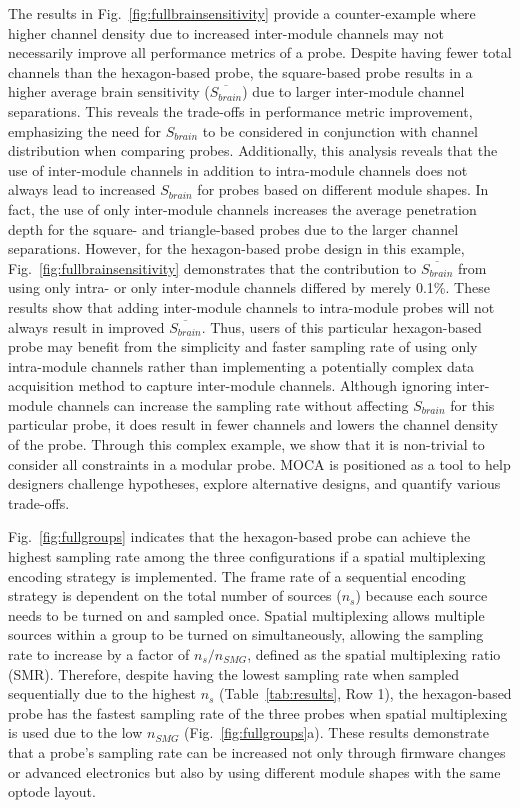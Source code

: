 The results in Fig.~\ref{fig:fullbrainsensitivity} provide a counter-example where higher channel density due to increased inter-module channels may not necessarily improve all performance metrics of a probe. Despite having fewer total channels than the hexagon-based probe, the square-based probe results in a higher average brain sensitivity ($\overline{S_{brain}}$) due to larger inter-module channel separations. This reveals the trade-offs in performance metric improvement, emphasizing the need for $S_{brain}$ to be considered in conjunction with channel distribution when comparing probes. Additionally, this analysis reveals that the use of inter-module channels in addition to intra-module channels does not always lead to increased $S_{brain}$ for probes based on different module shapes. In fact, the use of only inter-module channels increases the average penetration depth for the square- and triangle-based probes due to the larger channel separations. However, for the hexagon-based probe design in this example, Fig.~\ref{fig:fullbrainsensitivity} demonstrates that the contribution to $\overline{S_{brain}}$ from using only intra- or only inter-module channels differed by merely 0.1\%. These results show that adding inter-module channels to intra-module probes will not always result in improved $\overline{S_{brain}}$. Thus, users of this particular hexagon-based probe may benefit from the simplicity and faster sampling rate of using only intra-module channels rather than implementing a potentially complex data acquisition method to capture inter-module channels. Although ignoring inter-module channels can increase the sampling rate without affecting $S_{brain}$ for this particular probe, it does result in fewer channels and lowers the channel density of the probe. Through this complex example, we show that it is non-trivial to consider all constraints in a modular probe. \ac{MOCA} is positioned as a tool to help designers challenge hypotheses, explore alternative designs, and quantify various trade-offs.

Fig.~\ref{fig:fullgroups} indicates that the hexagon-based probe can achieve the highest sampling rate among the three configurations if a spatial multiplexing encoding strategy is implemented. The frame rate of a sequential encoding strategy is dependent on the total number of sources ($n_s$) because each source needs to be turned on and sampled once. Spatial multiplexing allows multiple sources within a group to be turned on simultaneously, allowing the sampling rate to increase by a factor of $n_s/n_{SMG}$, defined as the spatial multiplexing ratio (SMR). Therefore, despite having the lowest sampling rate when sampled sequentially due to the highest $n_s$ (Table~\ref{tab:results}, Row 1), the hexagon-based probe has the fastest sampling rate of the three probes when spatial multiplexing is used due to the low $n_{SMG}$ (Fig.~\ref{fig:fullgroups}a). These results demonstrate that a probe's sampling rate can be increased not only through firmware changes or advanced electronics but also by using different module shapes with the same optode layout.


